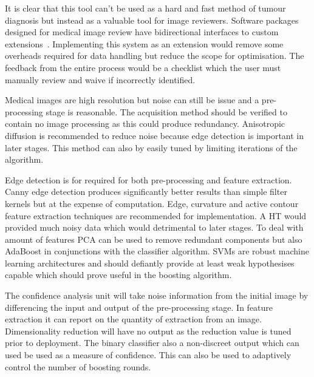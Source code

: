 \documentclass[journal]{IEEEtran}
\begin{document}
It is clear that this tool can't be used as a hard and fast method of tumour diagnosis but instead as a valuable tool for image reviewers.
Software packages designed for medical image review have bidirectional interfaces to custom extensions~\cite{slicer}.
Implementing this system as an extension would remove some overheads required for data handling but reduce the scope for optimisation.
The feedback from the entire process would be a checklist which the user must manually review and waive if incorrectly identified.

Medical images are high resolution but noise can still be issue and a pre-processing stage is reasonable.
The acquisition method should be verified to contain no image processing as this could produce redundancy.
Anisotropic diffusion is recommended to reduce noise because edge detection is important in later stages.
This method can also by easily tuned by limiting iterations of the algorithm.

Edge detection is for required for both pre-processing and feature extraction.
Canny edge detection produces significantly better results than simple filter kernels but at the expense of computation.
Edge, curvature and active contour feature extraction techniques are recommended for implementation.
A HT would provided much noisy data which would detrimental to later stages.
To deal with amount of features PCA can be used to remove redundant components but also AdaBoost in conjunctions with the classifier algorithm.
SVMs are robust machine learning architectures and should defiantly provide at least weak hypothesises capable which should prove useful in the boosting algorithm. 


The confidence analysis unit will take noise information from the initial image by differencing the input and output of the pre-processing stage.
In feature extraction it can report on the quantity of extraction from an image. 
Dimensionality reduction will have no output as the reduction value is tuned prior to deployment.
The binary classifier also a non-discreet output which can used be used as a measure of confidence.
This can also be used to adaptively control the number of boosting rounds.









\end{document}
